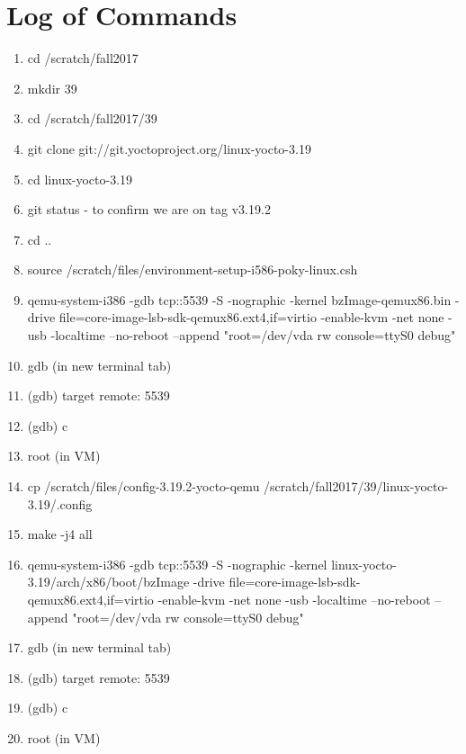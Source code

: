 \documentclass[letterpaper,10pt,draftclsnofoot,onecolumn,titlepage]{IEEEtran}
\begin{document}
\section{Log of Commands}
\begin{enumerate}
\item cd /scratch/fall2017
\item mkdir 39
\item cd /scratch/fall2017/39
\item git clone git://git.yoctoproject.org/linux-yocto-3.19
\item cd linux-yocto-3.19
\item git status - to confirm we are on tag v3.19.2
\item cd ..
\item source /scratch/files/environment-setup-i586-poky-linux.csh
\item qemu-system-i386 -gdb tcp::5539 -S -nographic -kernel bzImage-qemux86.bin -drive file=core-image-lsb-sdk-qemux86.ext4,if=virtio -enable-kvm -net none -usb -localtime --no-reboot --append "root=/dev/vda rw console=ttyS0 debug"
\item gdb (in new terminal tab)
\item (gdb) target remote: 5539
\item (gdb) c
\item root (in VM)
\item cp /scratch/files/config-3.19.2-yocto-qemu /scratch/fall2017/39/linux-yocto-3.19/.config
\item make -j4 all
\item qemu-system-i386 -gdb tcp::5539 -S -nographic -kernel linux-yocto-3.19/arch/x86/boot/bzImage -drive file=core-image-lsb-sdk-qemux86.ext4,if=virtio -enable-kvm -net none -usb -localtime --no-reboot --append "root=/dev/vda rw console=ttyS0 debug"
\item gdb (in new terminal tab)
\item (gdb) target remote: 5539
\item (gdb) c
\item root (in VM)


\end{enumerate}
%
\end{document}
